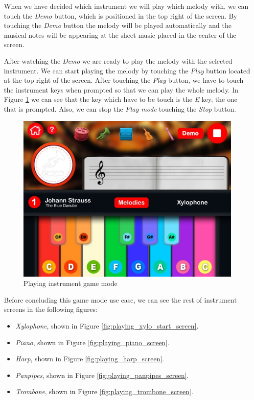 \FloatBarrier

When we have decided which instrument we will play which melody with, we can touch the \textit{Demo} button, which is positioned in the top right of the screen. By touching the \textit{Demo} button the melody will be played automatically and the musical notes will be appearing at the sheet music placed in the center of the screen.

After watching the \textit{Demo} we are ready to play the melody with the selected instrument. We can start playing the melody by touching the \textit{Play} button located at the top right of the screen. After touching the \textit{Play} button, we have to touch the instrument keys when prompted so that we can play the whole melody. In Figure \ref{fig:play_playing_screen} we can see that the key which have to be touch is the \textit{E} key, the one that is prompted. Also, we can stop the \textit{Play mode} touching the \textit{Stop} button.

\begin{figure}[ht!]
	\centering
	\includegraphics[width=400pt]{graphics/use-case/play_playing_screen.jpg}
	\caption{Playing instrument game mode}
	\label{fig:play_playing_screen}
\end{figure}

\FloatBarrier

Before concluding this game mode use case, we can see the rest of instrument screens in the following figures:
\begin{itemize}
\item \textit{Xylophone}, shown in Figure \ref{fig:playing_xylo_start_screen}.
\item \textit{Piano}, shown in Figure \ref{fig:playing_piano_screen}.
\item \textit{Harp}, shown in Figure \ref{fig:playing_harp_screen}.
\item \textit{Panpipes}, shown in Figure \ref{fig:playing_panpipes_screen}.
\item \textit{Trombone}, shown in Figure \ref{fig:playing_trombone_screen}.
\end{itemize}

